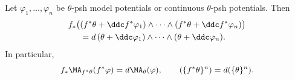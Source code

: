 \begin{theorem}\label{thm:finite-ma-projection}
Let $\varphi_1,\ldots,\varphi_n$ be $\theta$-psh model potentials or
continuous $\theta$-psh potentials.  Then
\begin{equation}
\label{eq:finite-ma-projection}
\begin{split}
 f_*\bigl(& (f^*\theta+\ddc f^*\varphi_1)\wedge\cdots\wedge
                 (f^*\theta+\ddc f^*\varphi_n)\bigr)\\
 & =d\,(\theta+\ddc\varphi_1)\wedge\cdots\wedge
                 (\theta+\ddc\varphi_n).
\end{split}
\end{equation}
In particular,
\begin{equation}
\label{eq:finite-diagonal-projection}
 f_*\MA_{f^*\theta}(f^*\varphi)=d\MA_\theta(\varphi),
 \qquad
 (\{f^*\theta\}^n)=d(\{\theta\}^n).
\end{equation}
\end{theorem}

